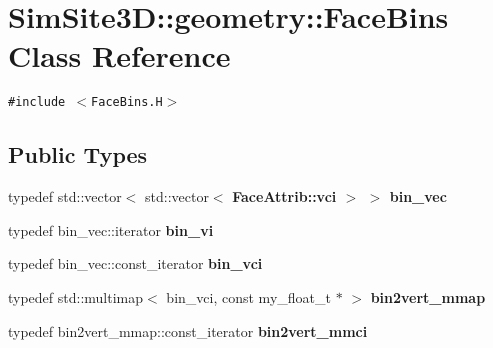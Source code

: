 \section{SimSite3D::geometry::Face\-Bins Class Reference}
\label{classSimSite3D_1_1geometry_1_1FaceBins}
{\tt \#include $<$Face\-Bins.H$>$}

\subsection*{Public Types}
\begin{CompactItemize}
\item 
typedef std::vector$<$ std::vector$<$ \bf{Face\-Attrib::vci} $>$ $>$ \textbf{bin\_\-vec}\label{classSimSite3D_1_1geometry_1_1FaceBins_a3dce5cb791c141498e19582ec6082ff}

\item 
typedef bin\_\-vec::iterator \textbf{bin\_\-vi}\label{classSimSite3D_1_1geometry_1_1FaceBins_b18d45138a3d245ded25a784d1b08024}

\item 
typedef bin\_\-vec::const\_\-iterator \textbf{bin\_\-vci}\label{classSimSite3D_1_1geometry_1_1FaceBins_dce15524d5ca553395257c9fbc9bfd8a}

\item 
typedef std::multimap$<$ bin\_\-vci, const my\_\-float\_\-t $\ast$ $>$ \textbf{bin2vert\_\-mmap}\label{classSimSite3D_1_1geometry_1_1FaceBins_58e128fd98431ca4cb237fd525fdaa60}

\item 
typedef bin2vert\_\-mmap::const\_\-iterator \textbf{bin2vert\_\-mmci}\label{classSimSite3D_1_1geometry_1_1FaceBins_f1db25ac06e59f0cb4b24474a2b9d0c3}

\end{CompactItemize}
